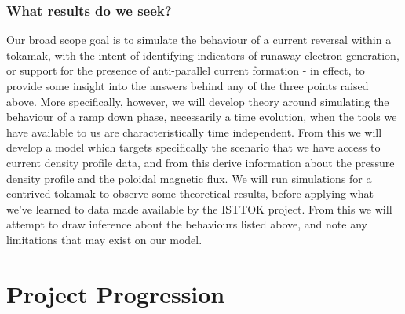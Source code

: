\subsubsection{What results do we seek?}
Our broad scope goal is to simulate the behaviour of a current reversal within a tokamak, with the intent 
of identifying indicators of runaway electron generation, or support for the presence of anti-parallel current formation
- in effect, to provide some insight into the answers behind any of the three points raised above. 
More specifically, however, we will develop theory around simulating the behaviour of a ramp down phase, necessarily a time evolution, when 
the tools we have available to us are characteristically time independent. From this we will develop a model 
which targets specifically the scenario that we have access to current density profile data, and from this 
derive information about the pressure density profile and the poloidal magnetic flux. We will run simulations 
for a contrived tokamak to observe some theoretical results, before applying what we've learned to data 
made available by the ISTTOK project. From this we will attempt to draw inference about the behaviours listed 
above, and note any limitations that may exist on our model.

\section{Project Progression}

